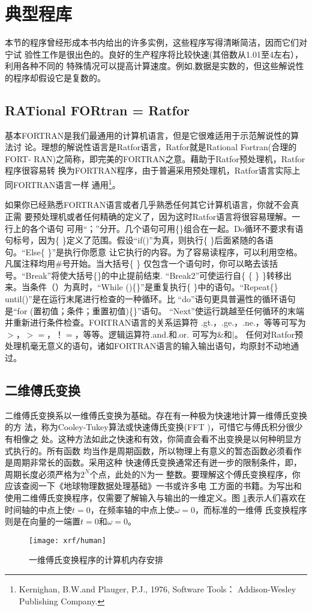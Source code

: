 \section{典型程库}
本节的程序曾经形成本书内给出的许多实例，这些程序写得清晰简洁，因而它们对宁试
验性工作是很出色的。良好的生产程序将比较快速(其倍数从1.01至4左右），利用各种不同的
特殊情况可以提高计算速度。例如,数据是实数的，但这些解说性的程序却假设它是复数的。

\subsection{RATional FORtran = Ratfor}
基本FORTRAN是我们最通用的计算机语言，但是它很难适用于示范解说性的算法讨
论。理想的解说性语言是Ratfor语言，Ratfor就是Rational Fortran(合理的FORT-
RAN)之简称，即完美的FORTRAN之意。藉助于Ratfor预处理机，Ratfor程序很容易转
换为FORTRAN程序，由于普遍采用预处理机，Ratfor语言实际上同FORTRAN语言一样
通用\footnote{Kernighan, B.W.and Plauger, P.J., 1976, Software Tools：
Addison-Wesley Publishing Company.}。

如果你已经熟悉FORTRAN语言或者几乎熟悉任何其它计算机语言，你就不会真正需
要预处理机或者任何精确的定义了，因为这时Ratfor语言将很容易理解。一行上的各个语句
可用“；”分开。几个语句可用\{\}组合在一起。Do循环不要求有语句标号，因为\{
\}定义了范围。假设“if()”为真，则执行\{ \}后面紧随的各语句。“Else\{
\}”是执行你愿意
让它执行的内容。为了容易读程序，可以利用空格。凡属注释均用\#号开始。当大括号\{
\}
仅包含一个语句时，你可以略去该括号。“Break”将使大括号\{\}的中止提前结束.
“Break2”可使运行自\{ \{ \}
\}转移出来。当条件（）为真时，“While ()\{\}”是重复执行\{
\}中的语句。“Repeat\{\} until()”是在运行末尾进行检查的一种循环。比
“do”语句更具普遍性的循环语句是“for
(置初值；条件；重置初值)\{\}”语句。
“Next”使运行跳越至任何循环的末端并重新进行条件检查。FORTRAN语言的关系运算符
.gt.，.ge.，.ne.，等等可写为$>$，$>=$，！$=$，等等。逻辑运算符.and.和.or.
可写为\&和$\mid$。
任何对Ratfor预处理机毫无意义的语句，诸如FORTRAN语言的输入输出语句，均原封不动地通过。

\subsection{二维傅氏变换}
二维傅氏变换系以一维傅氏变换为基础。存在有一种极为快速地计算一维傅氏变换的方
法，称为Cooley-Tukey算法或快速傳氏变换(FFT
)，可惜它与傅氏积分很少有相像之
处。这种方法如此之快速和有效，你简直会看不出变换是以何种明显方式执行的。所有函数
均当作是周期函数，所以物理上有意义的暂态函数必须看作是周期非常长的函数。采用这种
快速傅氏变换通常还有迸一步的限制条件，即，周期长度必须严格为$2^N$个点，此处的N为一
整数。要理解这个傅氏变换程序，你应该查阅一下《地球物理数据处理基础》一书或许多电
工方面的书籍。为写出和使用二维傅氏变换程序，仅需要了解输入与输出的一维定义。图
\ref{fig:xrf/human}表示人们喜欢在时间轴的中点上使$t=0$，在频率轴的中点上使$\omega=0$，而标准的一维傅
氏变换程序则是在向量的一端置$t=0$和$\omega=0$。
\begin{figure}[H]
\centering
\texttt{[image: xrf/human]}
\caption[human]{一维傅氏变换程序的计算机内存安排}
\label{fig:xrf/human}
\end{figure}

